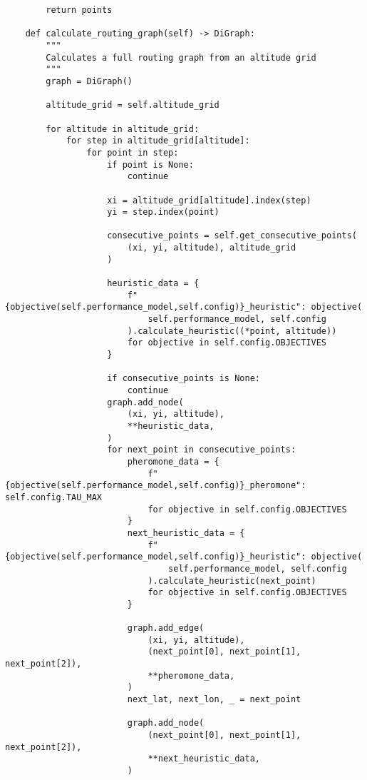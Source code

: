 \begin{verbatim}
        return points

    def calculate_routing_graph(self) -> DiGraph:
        """
        Calculates a full routing graph from an altitude grid
        """
        graph = DiGraph()

        altitude_grid = self.altitude_grid

        for altitude in altitude_grid:
            for step in altitude_grid[altitude]:
                for point in step:
                    if point is None:
                        continue

                    xi = altitude_grid[altitude].index(step)
                    yi = step.index(point)

                    consecutive_points = self.get_consecutive_points(
                        (xi, yi, altitude), altitude_grid
                    )

                    heuristic_data = {
                        f"{objective(self.performance_model,self.config)}_heuristic": objective(
                            self.performance_model, self.config
                        ).calculate_heuristic((*point, altitude))
                        for objective in self.config.OBJECTIVES
                    }

                    if consecutive_points is None:
                        continue
                    graph.add_node(
                        (xi, yi, altitude),
                        **heuristic_data,
                    )
                    for next_point in consecutive_points:
                        pheromone_data = {
                            f"{objective(self.performance_model,self.config)}_pheromone": self.config.TAU_MAX
                            for objective in self.config.OBJECTIVES
                        }
                        next_heuristic_data = {
                            f"{objective(self.performance_model,self.config)}_heuristic": objective(
                                self.performance_model, self.config
                            ).calculate_heuristic(next_point)
                            for objective in self.config.OBJECTIVES
                        }

                        graph.add_edge(
                            (xi, yi, altitude),
                            (next_point[0], next_point[1], next_point[2]),
                            **pheromone_data,
                        )
                        next_lat, next_lon, _ = next_point

                        graph.add_node(
                            (next_point[0], next_point[1], next_point[2]),
                            **next_heuristic_data,
                        )


\end{verbatim}
